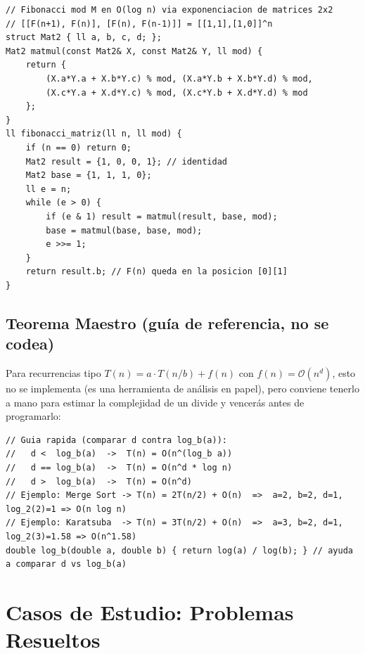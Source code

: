 \documentclass[10pt,twocolumn,letterpaper]{report}
\begin{document}
\begin{lstlisting}
// Fibonacci mod M en O(log n) via exponenciacion de matrices 2x2
// [[F(n+1), F(n)], [F(n), F(n-1)]] = [[1,1],[1,0]]^n
struct Mat2 { ll a, b, c, d; };
Mat2 matmul(const Mat2& X, const Mat2& Y, ll mod) {
    return {
        (X.a*Y.a + X.b*Y.c) % mod, (X.a*Y.b + X.b*Y.d) % mod,
        (X.c*Y.a + X.d*Y.c) % mod, (X.c*Y.b + X.d*Y.d) % mod
    };
}
ll fibonacci_matriz(ll n, ll mod) {
    if (n == 0) return 0;
    Mat2 result = {1, 0, 0, 1}; // identidad
    Mat2 base = {1, 1, 1, 0};
    ll e = n;
    while (e > 0) {
        if (e & 1) result = matmul(result, base, mod);
        base = matmul(base, base, mod);
        e >>= 1;
    }
    return result.b; // F(n) queda en la posicion [0][1]
}
\end{lstlisting}

\section{Teorema Maestro (guía de referencia, no se codea)}
Para recurrencias tipo $T(n) = a \cdot T(n/b) + f(n)$ con $f(n) = \mathcal{O}(n^d)$, esto no se implementa (es una herramienta de análisis en papel), pero conviene tenerlo a mano para estimar la complejidad de un divide y vencerás antes de programarlo:
\begin{lstlisting}
// Guia rapida (comparar d contra log_b(a)):
//   d <  log_b(a)  ->  T(n) = O(n^(log_b a))
//   d == log_b(a)  ->  T(n) = O(n^d * log n)
//   d >  log_b(a)  ->  T(n) = O(n^d)
// Ejemplo: Merge Sort -> T(n) = 2T(n/2) + O(n)  =>  a=2, b=2, d=1, log_2(2)=1 => O(n log n)
// Ejemplo: Karatsuba  -> T(n) = 3T(n/2) + O(n)  =>  a=3, b=2, d=1, log_2(3)=1.58 => O(n^1.58)
double log_b(double a, double b) { return log(a) / log(b); } // ayuda a comparar d vs log_b(a)
\end{lstlisting}
\chapter{Casos de Estudio: Problemas Resueltos}
\end{document}

